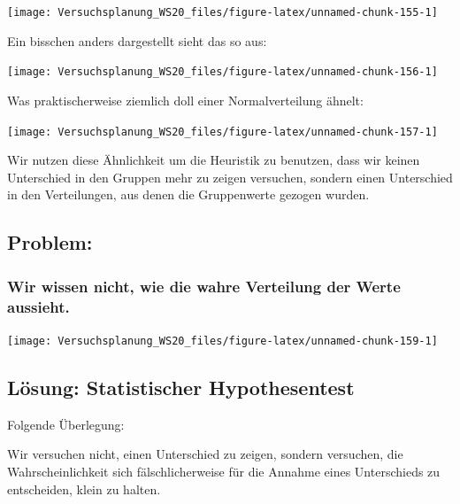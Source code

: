 \documentclass[
]{book}
\begin{document}
\begin{center}\texttt{[image: Versuchsplanung\_WS20\_files/figure-latex/unnamed-chunk-155-1]} \end{center}

Ein bisschen anders dargestellt sieht das so aus:

\begin{center}\texttt{[image: Versuchsplanung\_WS20\_files/figure-latex/unnamed-chunk-156-1]} \end{center}

Was praktischerweise ziemlich doll einer Normalverteilung ähnelt:

\begin{center}\texttt{[image: Versuchsplanung\_WS20\_files/figure-latex/unnamed-chunk-157-1]} \end{center}

Wir nutzen diese Ähnlichkeit um die Heuristik zu benutzen, dass wir keinen Unterschied in den Gruppen mehr zu zeigen versuchen, sondern einen Unterschied in den Verteilungen, aus denen die Gruppenwerte gezogen wurden.

\hypertarget{problem}{%
\subsection{Problem:}\label{problem}}

\hypertarget{wir-wissen-nicht-wie-die-wahre-verteilung-der-werte-aussieht.}{%
\subsubsection{Wir wissen nicht, wie die wahre Verteilung der Werte aussieht.}\label{wir-wissen-nicht-wie-die-wahre-verteilung-der-werte-aussieht.}}

\begin{center}\texttt{[image: Versuchsplanung\_WS20\_files/figure-latex/unnamed-chunk-159-1]} \end{center}

\hypertarget{luxf6sung-statistischer-hypothesentest}{%
\subsection{Lösung: Statistischer Hypothesentest}\label{luxf6sung-statistischer-hypothesentest}}

Folgende Überlegung:

Wir versuchen nicht, einen Unterschied zu zeigen, sondern versuchen, die Wahrscheinlichkeit sich fälschlicherweise für die Annahme eines Unterschieds zu entscheiden, klein zu halten.
\end{document}
